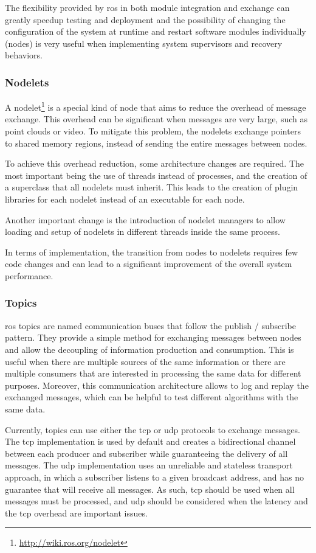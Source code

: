 The flexibility provided by \gls{ros} in both module integration and exchange can greatly speedup testing and deployment and the possibility of changing the configuration of the system at runtime and restart software modules individually (nodes) is very useful when implementing system supervisors and recovery behaviors.


\subsubsection{Nodelets}

A nodelet\footnote{\url{http://wiki.ros.org/nodelet}} is a special kind of node that aims to reduce the overhead of message exchange. This overhead can be significant when messages are very large, such as point clouds or video. To mitigate this problem, the nodelets exchange pointers to shared memory regions, instead of sending the entire messages between nodes.

To achieve this overhead reduction, some architecture changes are required. The most important being the use of threads instead of processes, and the creation of a superclass that all nodelets must inherit. This leads to the creation of plugin libraries for each nodelet instead of an executable for each node.

Another important change is the introduction of nodelet managers to allow loading and setup of nodelets in different threads inside the same process.

In terms of implementation, the transition from nodes to nodelets requires few code changes and can lead to a significant improvement of the overall system performance.


\subsubsection{Topics}

\gls{ros} topics are named communication buses that follow the publish / subscribe pattern. They provide a simple method for exchanging messages between nodes and allow the decoupling of information production and consumption. This is useful when there are multiple sources of the same information or there are multiple consumers that are interested in processing the same data for different purposes. Moreover, this communication architecture allows to log and replay the exchanged messages, which can be helpful to test different algorithms with the same data.

Currently, topics can use either the \gls{tcp} or \gls{udp} protocols to exchange messages. The \gls{tcp} implementation is used by default and creates a bidirectional channel between each producer and subscriber while guaranteeing the delivery of all messages. The \gls{udp} implementation uses an unreliable and stateless transport approach, in which a subscriber listens to a given broadcast address, and has no guarantee that will receive all messages. As such, \gls{tcp} should be used when all messages must be processed, and \gls{udp} should be considered when the latency and the \gls{tcp} overhead are important issues.



